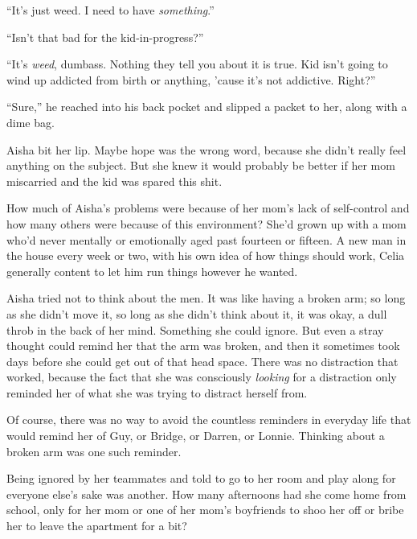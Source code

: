 ``It's just weed.  I need to have \emph{something}.''



``Isn't that bad for the kid-in-progress?''



``It's \emph{weed}, dumbass.  Nothing they tell you about it is true.  Kid isn't going to wind up addicted from birth or anything, 'cause it's not addictive.  Right?''



``Sure,'' he reached into his back pocket and slipped a packet to her, along with a dime bag.



Aisha bit her lip.  Maybe hope was the wrong word, because she didn't really feel anything on the subject.  But she knew it would probably be better if her mom miscarried and the kid was spared this shit.



How much of Aisha's problems were because of her mom's lack of self-control and how many others were because of this environment?  She'd grown up with a mom who'd never mentally or emotionally aged past fourteen or fifteen.  A new man in the house every week or two, with his own idea of how things should work, Celia generally content to let him run things however he wanted.



Aisha tried not to think about the men.  It was like having a broken arm; so long as she didn't move it, so long as she didn't think about it, it was okay, a dull throb in the back of her mind.  Something she could ignore.  But even a stray thought could remind her that the arm was broken, and then it sometimes took days before she could get out of that head space.  There was no distraction that worked, because the fact that she was consciously \emph{looking} for a distraction only reminded her of what she was trying to distract herself from.



Of course, there was no way to avoid the countless reminders in everyday life that would remind her of Guy, or Bridge, or Darren, or Lonnie.  Thinking about a broken arm was one such reminder.



Being ignored by her teammates and told to go to her room and play along for everyone else's sake was another.  How many afternoons had she come home from school, only for her mom or one of her mom's boyfriends to shoo her off or bribe her to leave the apartment for a bit?



